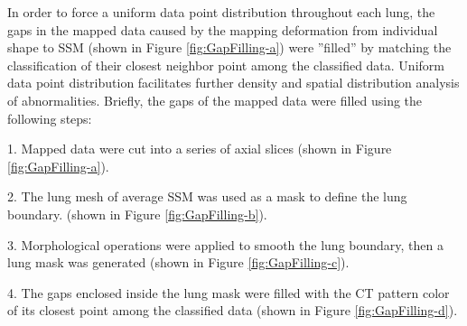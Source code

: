 In order to force a uniform data point distribution throughout each lung, the gaps in the mapped data caused by the mapping deformation from individual shape to SSM (shown in Figure \ref{fig:GapFilling-a}) were ''filled'' by matching the classification of their closest neighbor point among the classified data. Uniform data point distribution facilitates further density and spatial distribution analysis of abnormalities. Briefly, the gaps of the mapped data were filled using the following steps: 

1. Mapped data were cut into a series of axial slices (shown in Figure \ref{fig:GapFilling-a}).

2. The lung mesh of average SSM was used as a mask to define the lung boundary. (shown in Figure \ref{fig:GapFilling-b}).

3. Morphological operations were applied to smooth the lung boundary, then a lung mask was generated (shown in Figure \ref{fig:GapFilling-c}).

4. The gaps enclosed inside the lung mask were filled with the CT pattern color of its closest point among the classified data (shown in Figure \ref{fig:GapFilling-d}).


